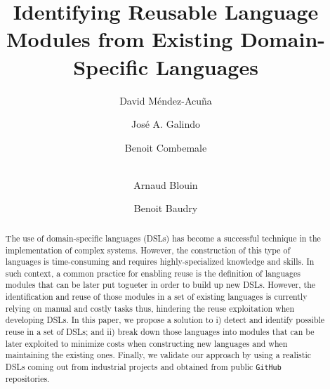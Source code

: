 \documentclass[runningheads,a4paper]{llncs}
\begin{document}
\mainmatter  %

\title{Identifying Reusable Language Modules from Existing Domain-Specific Languages}


\author{David M\'endez-Acu\~na \and Jos\'e A. Galindo \and Benoit Combemale \and \\ Arnaud Blouin \and Benoit Baudry}

\maketitle

\begin{abstract} 

The use of domain-specific languages (DSLs) has become a successful technique in the implementation of complex systems. However, the construction of this type of languages is time-consuming and requires highly-specialized knowledge and skills. 
In such context, a common practice for enabling reuse is the definition of languages modules that can be later put togueter  in order to build up new DSLs. However, the identification and reuse of those modules in a set of existing languages is currently relying on manual and costly tasks thus, hindering the reuse exploitation when developing DSLs. 
In this paper, we propose a solution to i) detect and identify possible reuse in a set of DSLs; and ii) break down those languages into modules that can be later exploited to minimize costs when constructing new languages and when maintaining the existing ones. Finally, we validate our approach by using a realistic DSLs coming out from industrial projects and obtained from public \texttt{GitHub} repositories.

\end{abstract}
\end{document}
